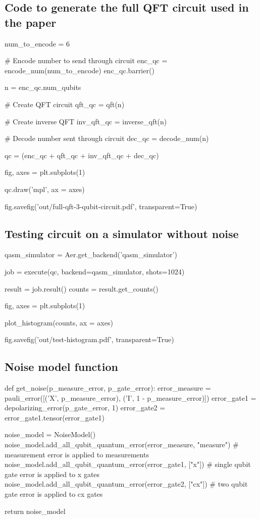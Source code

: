 \subsection{Code to generate the full QFT circuit used in the paper}
\label{subsec:generating-full-qft-circuit}

\begin{python}
num_to_encode = 6

# Encode number to send through circuit
enc_qc = encode_num(num_to_encode)
enc_qc.barrier()

n = enc_qc.num_qubits

# Create QFT circuit
qft_qc = qft(n)

# Create inverse QFT
inv_qft_qc = inverse_qft(n)

# Decode number sent through circuit
dec_qc = decode_num(n)


qc = (enc_qc + qft_qc + inv_qft_qc + dec_qc)

fig, axes = plt.subplots(1)

qc.draw('mpl', ax = axes)

fig.savefig('out/full-qft-3-qubit-circuit.pdf', transparent=True)
\end{python}

\subsection{Testing circuit on a simulator without noise}
\label{subsec:testing-circuit-simulator-no-noise}

\begin{python}
qasm_simulator = Aer.get_backend('qasm_simulator')

job = execute(qc, backend=qasm_simulator, shots=1024)

result = job.result()
counts = result.get_counts()

fig, axes = plt.subplots(1)

plot_histogram(counts, ax = axes)

fig.savefig('out/test-histogram.pdf', transparent=True)
\end{python}

\subsection{Noise model function}
\label{subsec:noise-model-function}

\begin{python}
def get_noise(p_measure_error, p_gate_error):
    error_measure = pauli_error([('X', p_measure_error), ('I', 1 - p_measure_error)])
    error_gate1 = depolarizing_error(p_gate_error, 1)
    error_gate2 = error_gate1.tensor(error_gate1)

    noise_model = NoiseModel()
    noise_model.add_all_qubit_quantum_error(error_measure, "measure") # measurement error is applied to measurements
    noise_model.add_all_qubit_quantum_error(error_gate1, ["x"]) # single qubit gate error is applied to x gates
    noise_model.add_all_qubit_quantum_error(error_gate2, ["cx"]) # two qubit gate error is applied to cx gates

    return noise_model
\end{python}

